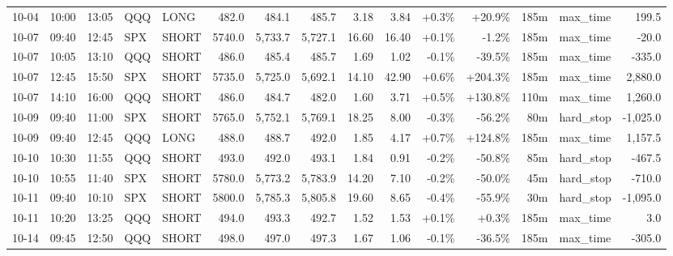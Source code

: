 \documentclass[11pt,a4paper,twoside]{article}
\begin{document}
\begin{landscape}
\begin{center}
\begin{longtable}{>{\color{txtmain}}l l l l l r r r r r r r r >{\color{txtmain}}l r}
10-04 & 10:00 & 13:05 & QQQ & LONG & 482.0 & 484.1 & 485.7 & 3.18 & 3.84 & \textcolor{wingreen}{+0.3\%} & \textcolor{wingreen}{+20.9\%} & 185m & max\_time & \textcolor{wingreen}{199.5} \\
10-07 & 09:40 & 12:45 & SPX & SHORT & 5740.0 & 5,733.7 & 5,727.1 & 16.60 & 16.40 & \textcolor{wingreen}{+0.1\%} & \textcolor{lossred}{-1.2\%} & 185m & max\_time & \textcolor{lossred}{-20.0} \\
10-07 & 10:05 & 13:10 & QQQ & SHORT & 486.0 & 485.4 & 485.7 & 1.69 & 1.02 & \textcolor{lossred}{-0.1\%} & \textcolor{lossred}{-39.5\%} & 185m & max\_time & \textcolor{lossred}{-335.0} \\
10-07 & 12:45 & 15:50 & SPX & SHORT & 5735.0 & 5,725.0 & 5,692.1 & 14.10 & 42.90 & \textcolor{wingreen}{+0.6\%} & \textcolor{wingreen}{+204.3\%} & 185m & max\_time & \textcolor{wingreen}{2,880.0} \\
10-07 & 14:10 & 16:00 & QQQ & SHORT & 486.0 & 484.7 & 482.0 & 1.60 & 3.71 & \textcolor{wingreen}{+0.5\%} & \textcolor{wingreen}{+130.8\%} & 110m & max\_time & \textcolor{wingreen}{1,260.0} \\
10-09 & 09:40 & 11:00 & SPX & SHORT & 5765.0 & 5,752.1 & 5,769.1 & 18.25 & 8.00 & \textcolor{lossred}{-0.3\%} & \textcolor{lossred}{-56.2\%} & 80m & hard\_stop & \textcolor{lossred}{-1,025.0} \\
10-09 & 09:40 & 12:45 & QQQ & LONG & 488.0 & 488.7 & 492.0 & 1.85 & 4.17 & \textcolor{wingreen}{+0.7\%} & \textcolor{wingreen}{+124.8\%} & 185m & max\_time & \textcolor{wingreen}{1,157.5} \\
10-10 & 10:30 & 11:55 & QQQ & SHORT & 493.0 & 492.0 & 493.1 & 1.84 & 0.91 & \textcolor{lossred}{-0.2\%} & \textcolor{lossred}{-50.8\%} & 85m & hard\_stop & \textcolor{lossred}{-467.5} \\
10-10 & 10:55 & 11:40 & SPX & SHORT & 5780.0 & 5,773.2 & 5,783.9 & 14.20 & 7.10 & \textcolor{lossred}{-0.2\%} & \textcolor{lossred}{-50.0\%} & 45m & hard\_stop & \textcolor{lossred}{-710.0} \\
10-11 & 09:40 & 10:10 & SPX & SHORT & 5800.0 & 5,785.3 & 5,805.8 & 19.60 & 8.65 & \textcolor{lossred}{-0.4\%} & \textcolor{lossred}{-55.9\%} & 30m & hard\_stop & \textcolor{lossred}{-1,095.0} \\
10-11 & 10:20 & 13:25 & QQQ & SHORT & 494.0 & 493.3 & 492.7 & 1.52 & 1.53 & \textcolor{wingreen}{+0.1\%} & \textcolor{wingreen}{+0.3\%} & 185m & max\_time & \textcolor{wingreen}{3.0} \\
10-14 & 09:45 & 12:50 & QQQ & SHORT & 498.0 & 497.0 & 497.3 & 1.67 & 1.06 & \textcolor{lossred}{-0.1\%} & \textcolor{lossred}{-36.5\%} & 185m & max\_time & \textcolor{lossred}{-305.0} \\

\end{longtable}
\end{center}
\end{landscape}
\end{document}

